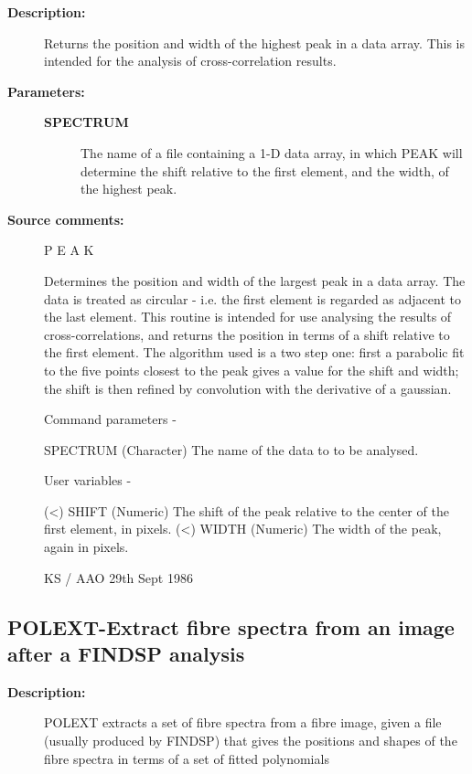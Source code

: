 \begin{description}
\begin{description}
\item [\textbf{Description:}]
 Returns the position and width of the highest peak in a data
 array.  This is intended for the analysis of cross-correlation
 results.

\item [\textbf{Parameters:}]
\begin{description}
\item [\textbf{SPECTRUM}]
 The name of a file containing a 1-D data array, in
 which PEAK will determine the shift relative to the
 first element, and the width, of the highest peak.
\end{description}

\item [\textbf{Source comments:}]
\begin{terminalv}
 P E A K

 Determines the position and width of the largest peak in a data
 array.  The data is treated as circular - i.e. the first element is
 regarded as adjacent to the last element.  This routine is
 intended for use analysing the results of cross-correlations,
 and returns the position in terms of a shift relative to the
 first element.  The algorithm used is a two step one: first a
 parabolic fit to the five points closest to the peak gives a
 value for the shift and width; the shift is then refined by
 convolution with the derivative of a gaussian.

 Command parameters -

 SPECTRUM (Character) The name of the data to to be analysed.

 User variables -

 (<) SHIFT   (Numeric) The shift of the peak relative to the
             center of the first element, in pixels.
 (<) WIDTH   (Numeric) The width of the peak, again in pixels.

                                             KS / AAO 29th Sept 1986
\end{terminalv}
\end{description}
\subsection{POLEXT-\label{POLEXT}Extract fibre spectra from an image after a FINDSP analysis}
\begin{description}

\item [\textbf{Description:}]
 POLEXT extracts a set of fibre spectra from a fibre image, given
 a file (usually produced by FINDSP) that gives the positions and
 shapes of the fibre spectra in terms of a set of fitted polynomials


\end{description}
\end{description}
